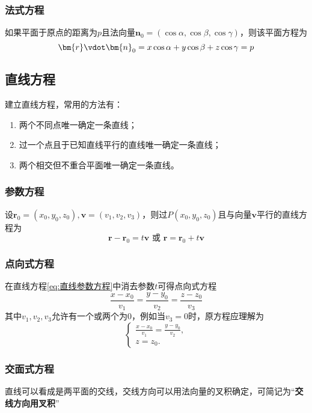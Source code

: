 \subsubsection{法式方程}
如果平面于原点的距离为$p$且法向量$\bm{n}_0=(\cos\alpha,\cos\beta,\cos\gamma)$，则该平面方程为
\begin{equation}
    \label{eq:平面法式方程}
    \bm{r}\vdot\bm{n}_0 = x\cos\alpha + y\cos\beta + z\cos\gamma = p
\end{equation}

\subsection{直线方程}
建立直线方程，常用的方法有：
\begin{enumerate}[(1)]
    \item 两个不同点唯一确定一条直线；
    \item 过一个点且于已知直线平行的直线唯一确定一条直线；
    \item 两个相交但不重合平面唯一确定一条直线。
\end{enumerate}

\subsubsection{参数方程}
设$\bm{r}_0=(x_0,y_0,z_0),\bm{v}=(v_1,v_2,v_3)$，则过$P(x_0,y_0,z_0)$且与向量$\bm{v}$平行的直线方程为
\begin{equation}
    \label{eq:直线参数方程}
    \bm{r}-\bm{r}_0 = t\bm{v}\text{ 或~} \bm{r} = \bm{r}_0 + t\bm{v}
\end{equation}

\subsubsection{点向式方程}
在直线方程\ref{eq:直线参数方程}中消去参数$t$可得点向式方程
\begin{equation}
    \label{eq:直线点向式方程}
    \frac{x-x_0}{v_1} = \frac{y-y_0}{v_2} = \frac{z-z_0}{v_3}
\end{equation}
其中$v_1,v_2,v_3$允许有一个或两个为$0$，例如当$v_3=0$时，原方程应理解为
\[
    \begin{cases}
        \frac{x-x_0}{v_1} = \frac{y-y_0}{v_2}, \\
        z=z_0.
    \end{cases}
\]

\subsubsection{交面式方程}
直线可以看成是两平面的交线，交线方向可以用法向量的叉积确定，可简记为“\textbf{\textsf{交线方向用叉积}}”

